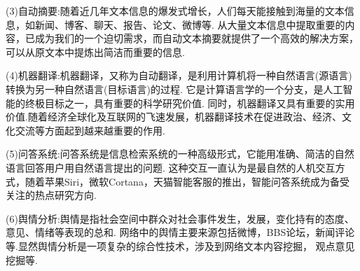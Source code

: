 \documentclass[bachelor,winfonts]{jnuthesis}
\begin{document}
(3)自动摘要:随着近几年文本信息的爆发式增长，人们每天能接触到海量的文本信息，如新闻、博客、聊天、报告、论文、微博等.
从大量文本信息中提取重要的内容，已成为我们的一个迫切需求，而自动文本摘要就提供了一个高效的解决方案，
可以从原文本中提炼出简洁而重要的信息.

(4)机器翻译:机器翻译，又称为自动翻译，是利用计算机将一种自然语言(源语言)转换为另一种自然语言(目标语言)的过程.
它是计算语言学的一个分支，是人工智能的终极目标之一，具有重要的科学研究价值.
同时，机器翻译又具有重要的实用价值.随着经济全球化及互联网的飞速发展，机器翻译技术在促进政治、经济、文化交流等方面起到越来越重要的作用.

(5)问答系统:问答系统是信息检索系统的一种高级形式，它能用准确、简洁的自然语言回答用户用自然语言提出的问题.
这种交互一直认为是最自然的人机交互方式，随着苹果Siri，微软Cortana，天猫智能客服的推出，智能问答系统成为备受关注的热点研究方向.

(6)舆情分析:舆情是指社会空间中群众对社会事件发生，发展，变化持有的态度、意见、情绪等表现的总和.
网络中的舆情主要来源包括微博，BBS论坛，新闻评论等.显然舆情分析是一项复杂的综合性技术，涉及到网络文本内容挖掘，
观点意见挖掘等.
\end{document}
